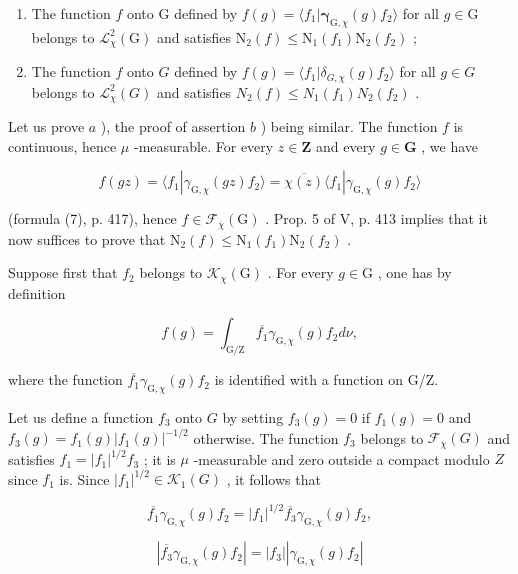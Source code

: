 \begin{enumerate}
\def\labelenumi{\alph{enumi})}
\item
  The function \(f\) onto \(\mathrm{G}\) defined by \(f(g) = \langle f_1 | \boldsymbol{\gamma}_{\mathrm{G},\chi}(g)f_2 \rangle\) for all \(g \in \mathrm{G}\) belongs to \(\mathcal{L}_{\chi}^{2}(\mathrm{G})\) and satisfies \(\mathrm{N}_2(f) \leqslant \mathrm{N}_1(f_1)\mathrm{N}_2(f_2)\) ;
\item
  The function \(f\) onto \(G\) defined by \(f(g) = \langle f_1 | \delta_{G,\chi}(g)f_2 \rangle\) for all \(g \in G\) belongs to \(\mathcal{L}_{\chi}^{2}(G)\) and satisfies \(N_2(f) \leqslant N_1(f_1)N_2(f_2)\) .
\end{enumerate}

Let us prove \(a\) ), the proof of assertion \(b\) ) being similar. The function \(f\) is continuous, hence \(\mu\) -measurable. For every \(z \in \mathbf{Z}\) and every \(g \in \mathbf{G}\) , we have

\[
f (g z) = \langle f _ {1} | \gamma_ {\mathrm{G}, \chi} (g z) f _ {2} \rangle = \overline {{\chi (z)}} \langle f _ {1} | \gamma_ {\mathrm{G}, \chi} (g) f _ {2} \rangle
\]

(formula (7), p. 417), hence \(f \in \mathcal{F}_{\overline{\chi}}(\mathrm{G})\) . Prop. 5 of V, p. 413 implies that it now suffices to prove that \(\mathrm{N}_2(f) \leqslant \mathrm{N}_1(f_1)\mathrm{N}_2(f_2)\) .

Suppose first that \(f_2\) belongs to \(\mathcal{K}_{\chi}(\mathrm{G})\) . For every \(g \in \mathrm{G}\) , one has by definition

\[
f (g) = \int_ {\mathrm{G/Z}} \overline {{f _ {1}}} \gamma_ {\mathrm{G}, \chi} (g) f _ {2} d \nu ,
\]

where the function \(\overline{f_1} \gamma_{\mathrm{G},\chi}(g)f_2\) is identified with a function on G/Z.

Let us define a function \(f_3\) onto \(G\) by setting \(f_3(g) = 0\) if \(f_1(g) = 0\) and \(f_3(g) = f_1(g)|f_1(g)|^{-1/2}\) otherwise. The function \(f_3\) belongs to \(\mathcal{F}_{\chi}(G)\) and satisfies \(f_1 = |f_1|^{1/2}f_3\) ; it is \(\mu\) -measurable and zero outside a compact modulo \(Z\) since \(f_1\) is. Since \(|f_1|^{1/2} \in \mathcal{K}_1(G)\) , it follows that

\[
\overline {{f _ {1}}} \gamma_ {\mathrm{G}, \chi} (g) f _ {2} = | f _ {1} | ^ {1 / 2} \overline {{f _ {3}}} \gamma_ {\mathrm{G}, \chi} (g) f _ {2},
\]

\[
| \overline {{f _ {3}}} \gamma_ {\mathrm{G}, \chi} (g) f _ {2} | = | f _ {3} | | \gamma_ {\mathrm{G}, \chi} (g) f _ {2} |
\]

